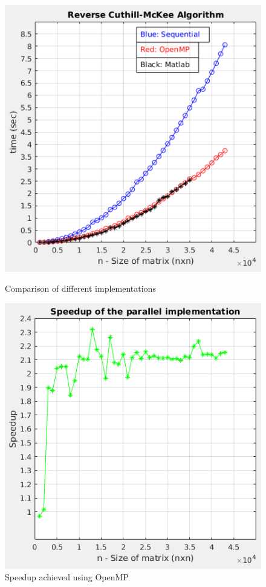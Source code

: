 \documentclass[letterpaper,12pt]{article}
\begin{document}
\begin{figure}[!htb]
	\centering
	\begin{minipage}[b]{0.42\textwidth}
		\includegraphics[width=\textwidth]{images/rcm.png}
		\caption{Comparison of different implementations}
		\label{fig:rcm}
	\end{minipage}
	\hfill
	\begin{minipage}[b]{0.42\textwidth}
		\includegraphics[width=\textwidth]{images/speedup.png}
		\caption{Speedup achieved using OpenMP}
		\label{fig:speedup}
	\end{minipage}
\end{figure}
\end{document}
